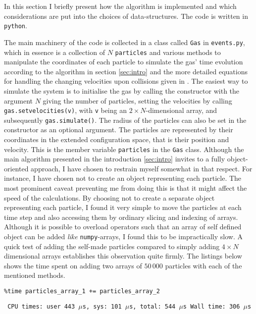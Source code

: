 In this section I briefly present how the algorithm is implemented and which considerations are put into the choices of data-structures. The code is written in \texttt{python}.


The main machinery of the code is collected in a class called \texttt{Gas} in \texttt{events.py}, which in essence is a collection of $N$ \texttt{particles} and various methods to manipulate the coordinates of each particle to simulate the gas' time evolution according to the algorithm in section \ref{sec:intro} and the more detailed equations for handling the changing velocities upon collisions given in \cite{sheet}.
The easiest way to simulate the system is to initialise the gas by calling the constructor with the argument $N$ giving the number of particles, setting the velocities by calling \texttt{gas.set\textunderscore velocities(v)}, with \texttt{v} being an $2 \times N $-dimensional array, and subsequently \texttt{gas.simulate()}. The radius of the particles can also be set in the constructor as an optional argument.
The particles are represented by their coordinates in the extended configuration space, that is their position and velocity. This is the member variable \texttt{particles} in the \texttt{Gas} class.
Although the main algorithm presented in the introduction \ref{sec:intro} invites to a fully object-oriented approach, I have chosen to restrain myself somewhat in that respect. 
For instance, I have chosen not to create an object representing each particle.
The most prominent caveat preventing me from doing this is that it might affect the speed of the calculations.
By choosing not to create a separate object representing each particle, I found it very simple to move the particles at each time step and also accessing them by ordinary slicing and indexing of arrays. 
Although it is possible to overload operators such that an array of self defined object can be added \textit{like} \texttt{numpy}-arrays, I found this to be impractically slow. 
A quick test of adding the self-made particles compared to simply adding $4\times N$ dimensional arrays establishes this observation quite firmly. The listings below shows the time spent on adding two arrays of $50\,000$ particles with each of the mentioned methods.

\begin{lstlisting}
%time particles_array_1 += particles_array_2
\end{lstlisting}
\texttt{\small
CPU times: user 443 $\mu$s, sys: 101 $\mu$s, total: 544 $\mu$s
Wall time: 306 $\mu$s
}

